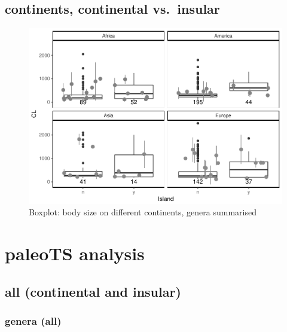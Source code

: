 \documentclass[]{article}
\begin{document}
\newpage

\subsection{continents, continental
vs.~insular}\label{continents-continental-vs.insular}

\begin{figure}[htbp]
\centering
\includegraphics{MA_JJ_files/figure-latex/Boxplot body size split into continents, continental vs. insular-1.pdf}
\caption{Boxplot: body size on different continents, genera summarised}
\end{figure}

\newpage

\section{paleoTS analysis}\label{paleots-analysis}

\subsection{all (continental and
insular)}\label{all-continental-and-insular}

\subsubsection{genera (all)}\label{genera-all}
\end{document}
